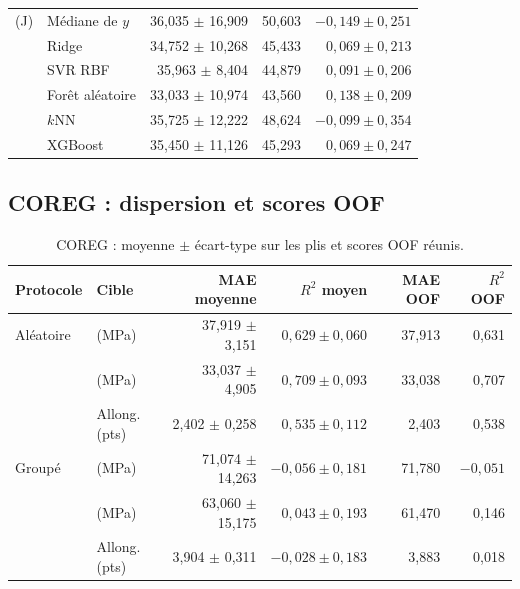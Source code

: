 \begin{table}[htbp]
\begin{tabular}{@{}l l r r r@{}}
\midrule
\charpy{} (J) & Médiane de $y$ & 36,035 $\pm$ 16,909 & 50,603 & $-0{,}149 \pm 0{,}251$ \\
              & Ridge          & 34,752 $\pm$ 10,268 & 45,433 & $0{,}069 \pm 0{,}213$ \\
              & SVR RBF        & 35,963 $\pm$ 8,404  & 44,879 & $0{,}091 \pm 0{,}206$ \\
              & Forêt aléatoire & 33,033 $\pm$ 10,974 & 43,560 & $0{,}138 \pm 0{,}209$ \\
              & $k$NN          & 35,725 $\pm$ 12,222 & 48,624 & $-0{,}099 \pm 0{,}354$ \\
              & XGBoost        & 35,450 $\pm$ 11,126 & 45,293 & $0{,}069 \pm 0{,}247$ \\
\bottomrule
\end{tabular}
\end{table}

\subsection{COREG : dispersion et scores OOF}

\begin{table}[htbp]
\centering
\small
\caption{COREG : moyenne $\pm$ écart-type sur les plis et scores OOF réunis.}
\label{tab:annexe_coreg}
\begin{tabular}{@{}l l r r r r@{}}
\toprule
Protocole & Cible & MAE moyenne & $R^2$ moyen & MAE OOF & $R^2$ OOF \\
\midrule
Aléatoire & \YS{} (MPa)   & 37,919 $\pm$ 3,151  & $0{,}629 \pm 0{,}060$ & 37,913 & 0,631 \\
          & \UTS{} (MPa)  & 33,037 $\pm$ 4,905  & $0{,}709 \pm 0{,}093$ & 33,038 & 0,707 \\
          & Allong. (pts) & 2,402 $\pm$ 0,258   & $0{,}535 \pm 0{,}112$ & 2,403  & 0,538 \\
Groupé    & \YS{} (MPa)   & 71,074 $\pm$ 14,263 & $-0{,}056 \pm 0{,}181$ & 71,780 & $-0{,}051$ \\
          & \UTS{} (MPa)  & 63,060 $\pm$ 15,175 & $0{,}043 \pm 0{,}193$ & 61,470 & 0,146 \\
          & Allong. (pts) & 3,904 $\pm$ 0,311   & $-0{,}028 \pm 0{,}183$ & 3,883  & 0,018 \\
\bottomrule
\end{tabular}
\end{table}

